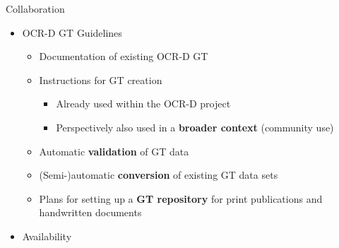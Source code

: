 \documentclass{bbawslides}
\begin{document}
\begin{bbawslide}{Collaboration}
  \vspace*{7mm}%
  \centerslidestrue%
  \begin{itemize}
    \item OCR-D GT Guidelines
    \begin{itemize}\small
      \item Documentation of existing OCR-D GT
      \item Instructions for GT creation
      \begin{itemize}\small
        \item Already used within the OCR-D project
        \item Perspectively also used in a \textbf{broader context} (community use)
      \end{itemize}
      \item Automatic \textbf{validation} of GT data
      \item (Semi-)automatic \textbf{conversion} of existing GT data sets
			\item Plans for setting up a \textbf{GT repository} for print publications and handwritten documents
    \end{itemize}
    \item Availability
  \end{itemize}
\end{bbawslide}
    
\end{document}

